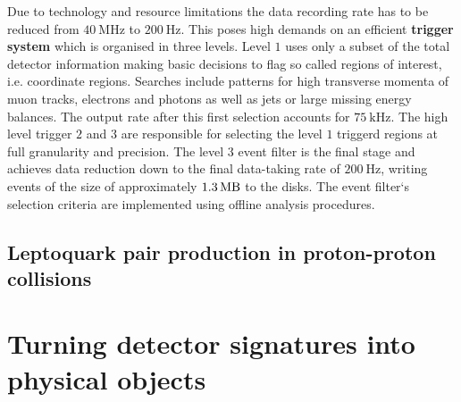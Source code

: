 Due to technology and resource limitations the data recording rate has to be reduced from $\SI{40}{\mega\hertz}$ to $\SI{200}{\hertz}$. This poses high demands on an efficient \textbf{trigger system} which is organised in three levels. Level $1$ uses only a subset of the total detector information making basic decisions to flag so called regions of interest, i.e. coordinate regions. Searches include patterns for high transverse momenta of muon tracks, electrons and photons as well as jets or large missing energy balances. The output rate after this first selection accounts for $\SI{75}{\kilo\hertz}$. The high level trigger $2$ and $3$ are responsible for selecting the level $1$ triggerd regions at full granularity and precision. The level $3$ event filter is the final stage and achieves data reduction down to the final data-taking rate of $\SI{200}{\hertz}$, writing events of the size of approximately $\SI{1.3}{\mega\byte}$ to the disks. The event filter`s selection criteria are implemented using offline analysis procedures. \cite{ATLASJINST}%
\section{Leptoquark pair production in proton-proton collisions}\label{LQpp}
\chapter{Turning detector signatures into physical objects}
